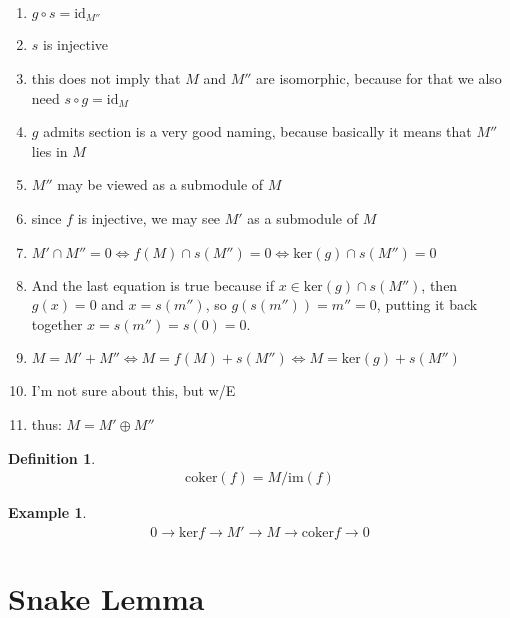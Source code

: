 \documentclass[a4paper]{book}
\theoremstyle{definition}
\newtheorem{definition}{Definition}[]
\newtheorem{example}{Example}[definition]
\begin{document}
\begin{enumerate}
    \item \(g \circ s = \text{id}_{M''}\)
    \item \(s\) is injective
    \item this does not imply that \(M\) and \(M''\) are isomorphic, because for that we also need \(s \circ g = \text{id}_{M}\)
    \item \(g\) admits section is a very good naming, because basically it means that \(M''\) lies in \(M\)
    \item \(M''\) may be viewed as a submodule of \(M\)
    \item since \(f\) is injective, we may see \(M'\) as a submodule of \(M\)
    \item \(M' \cap M'' = 0 \iff f(M) \cap s(M'') = 0 \iff \text{ker} (g) \cap s(M'') = 0\)
    \item And the last equation is true because if \(x \in \text{ker}(g) \cap s(M'')\), then \(g(x) = 0\) and \(x = s(m'')\), so \(g(s(m'')) = m'' = 0\), putting it back together \(x = s(m'') = s(0) = 0\).
    \item \(M = M' + M'' \iff M = f(M) + s(M'') \iff M = \text{ker}(g) + s(M'')\)
    \item I'm not sure about this, but w/E
    \item thus: \(M = M' \oplus M''\)
\end{enumerate}

\begin{defbox}
    \begin{definition}
        \begin{align*}
            \text{coker}(f) = M / \text{im}(f)
        \end{align*}
    \end{definition}
\end{defbox}

\begin{exmbox}
    \begin{example}
        \begin{align*}
            0 \longrightarrow \text{ker}f \longrightarrow M' \longrightarrow M \longrightarrow \text{coker} f \longrightarrow 0
        \end{align*}
    \end{example}
\end{exmbox}

\newpage
\section{Snake Lemma}


\newpage
\end{document}
